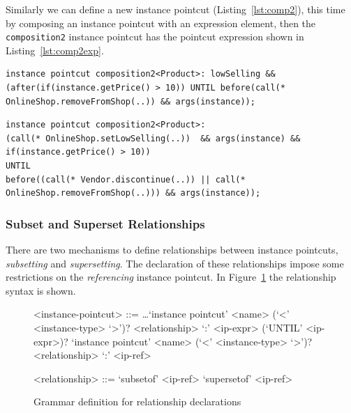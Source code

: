 \documentclass{acm_proc_article-sp}
\begin{document}
Similarly we can define a new instance pointcut (Listing~\ref{lst:comp2}), this time by composing an instance pointcut with an expression element, then the \texttt{composition2} instance pointcut has the pointcut expression shown in Listing~\ref{lst:comp2exp}.

\begin{lstlisting}[float=h!, caption={An instance pointcut and an expression is composed}, label={lst:comp2}]
instance pointcut composition2<Product>: lowSelling && (after(if(instance.getPrice() > 10)) UNTIL before(call(* OnlineShop.removeFromShop(..)) && args(instance));
\end{lstlisting}


\begin{lstlisting}[float=h!, caption={The composition2 instance pointcut after composition}, label={lst:comp2exp}]
instance pointcut composition2<Product>: 
(call(* OnlineShop.setLowSelling(..))  && args(instance) && if(instance.getPrice() > 10)) 
UNTIL
before((call(* Vendor.discontinue(..)) || call(* OnlineShop.removeFromShop(..))) && args(instance));
\end{lstlisting}



\subsubsection{Subset and Superset Relationships}
There are two mechanisms to define relationships between instance pointcuts, \emph{subsetting} and \emph{supersetting}. The declaration of these relationships impose some restrictions on the \emph{referencing} instance pointcut. In Figure~\ref{fig:grammar3} the relationship syntax is shown.

\begin{figure}[h]
\begin{grammar}
<instance-pointcut> ::= \ldots \alt `instance pointcut' <name> (`<' <instance-type> `>')? <relationship> `:' <ip-expr> (`UNTIL' <ip-expr>)?  \alt
	`instance pointcut' <name> (`<' <instance-type> `>')? <relationship> `:' <ip-ref>

<relationship> ::= `subsetof' <ip-ref> \alt `supersetof' <ip-ref>
\end{grammar}
\caption{Grammar definition for relationship declarations}
\label{fig:grammar3}
\end{figure}
\end{document}
